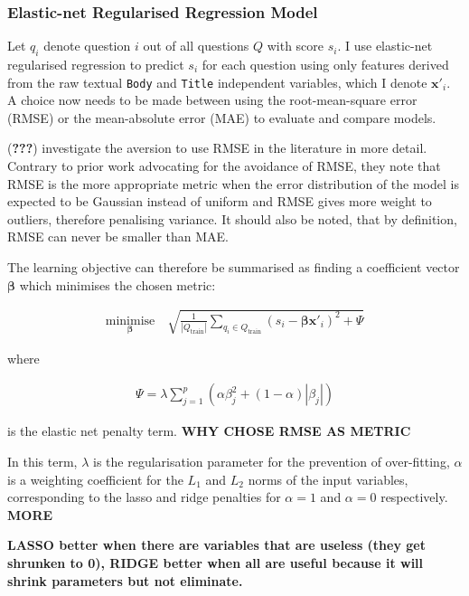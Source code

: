 \documentclass[11pt,preprint, authoryear]{article}
\numberwithin{equation}{section}
\begin{document}
\subsubsection{Elastic-net Regularised Regression
Model}\label{elastic-net-regularised-regression-model}

Let \(q_i\) denote question \(i\) out of all questions \(Q\) with score
\(s_i\). I use elastic-net regularised regression to predict \(s_i\) for
each question using only features derived from the raw textual
\texttt{Body} and \texttt{Title} independent variables, which I denote
\(\bm{x'}_i\). A choice now needs to be made between using the
root-mean-square error (RMSE) or the mean-absolute error (MAE) to
evaluate and compare models.

({\textbf{???}}) investigate the aversion to use RMSE in the literature
in more detail. Contrary to prior work advocating for the avoidance of
RMSE, they note that RMSE is the more appropriate metric when the error
distribution of the model is expected to be Gaussian instead of uniform
and RMSE gives more weight to outliers, therefore penalising variance.
It should also be noted, that by definition, RMSE can never be smaller
than MAE.

The learning objective can therefore be summarised as finding a
coefficient vector \(\bm{\beta}\) which minimises the chosen metric:

\begin{align} \label{eq:rmse}
\underset{\bm{\beta}}{\text{minimise}} \quad \sqrt{ \frac{1}{|Q_\text{train}|} \sum_{ q_{i} \in Q_{\text{train}} } ( s_i - {\bm{\beta}\bm{x'}_i} )^2 + \Psi }
\end{align}

where

\begin{align} \label{eq:penalty}
\Psi = \lambda \sum_{j=1}^p ( \alpha\beta_j^2 + (1-\alpha)|\beta_j| )
\end{align}

is the elastic net penalty term. \textbf{WHY CHOSE RMSE AS METRIC}

In this term, \(\lambda\) is the regularisation parameter for the
prevention of over-fitting, \(\alpha\) is a weighting coefficient for
the \(L_1\) and \(L_2\) norms of the input variables, corresponding to
the lasso and ridge penalties for \(\alpha=1\) and \(\alpha=0\)
respectively. \textbf{MORE}

\textbf{LASSO better when there are variables that are useless (they get
shrunken to 0), RIDGE better when all are useful because it will shrink
parameters but not eliminate.}
\end{document}
